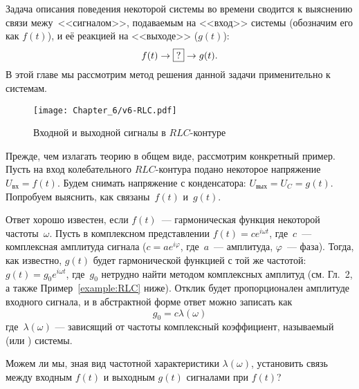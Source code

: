 Задача описания поведения некоторой системы во времени сводится к выяснению связи
межу~<<сигналом>>, подаваемым на <<вход>> системы (обозначим его как $f(t)$),
и её реакцией на <<выходе>> ($g(t)$):
\begin{equation*}
f(t)\to\fbox{?} \to g(t).
\end{equation*}
В этой главе мы рассмотрим  метод решения данной задачи применительно
к  системам.

\begin{wrapfigure}[10]{o}{0.3\textwidth}
    \centering
    \texttt{[image: Chapter\_6/v6-RLC.pdf]}
    \caption{Входной и выходной сигналы в $RLC$-контуре}
\end{wrapfigure}

Прежде, чем излагать теорию в общем виде, рассмотрим конкретный пример.
Пусть на вход колебательного $RLC$-кон\-ту\-ра подано некоторое
напряжение $U_{вх}=f(t)$. Будем снимать напряжение с конденсатора:
$U_{вых}=U_C = g(t)$. Попробуем выяснить, как связаны~$f(t)$ и~$g(t)$.

Ответ хорошо известен, если $f(t)$~--- гармоническая функция некоторой частоты~$\omega$.
Пусть в комплексном представлении $f(t)=c e^{i\omega t}$, где~$c$~---
комплексная амплитуда сигнала ($c=ae^{i\varphi}$, где~$a$~--- амплитуда,
$\varphi$~--- фаза). Тогда, как известно, $g(t)$ будет гармонической
функцией с той же частотой: $g(t)=g_0 e^{i\omega t}$, где~$g_0$
нетрудно найти методом комплексных амплитуд (см. Гл.~2, а также
Пример~\ref{example:RLC} ниже).
Отклик будет пропорционален амплитуде входного сигнала, и в
абстрактной форме ответ можно записать как
\begin{equation*}
g_0 = c\lambda(\omega)
\end{equation*}
где~$\lambda(\omega)$ --- зависящий от частоты комплексный коэффициент,
называемый 
(или ) системы.

Можем ли мы, зная вид частотной характеристики $\lambda(\omega)$, установить
связь между входным $f(t)$ и выходным $g(t)$ сигналами при  $f(t)$?


